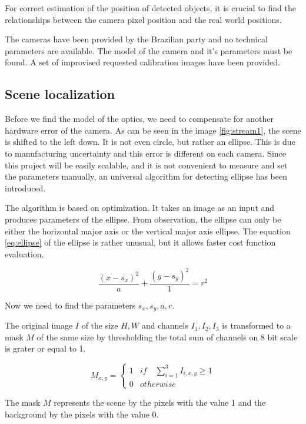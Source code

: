\documentclass[a4paper,12pt,titlepage, twoside]{article}
\numberwithin{figure}{section}
\begin{document}
For correct estimation of the position of detected objects, it is crucial to find the relationships between the camera pixel position and the real world positions. 

The cameras have been provided by the Brazilian party and no technical parameters are available. The model of the camera and it's parameters must be found. A set of improvised requested calibration images have been provided.

\subsection{Scene localization}
\label{sec:scene_localization}
Before we find the model of the optics, we need to compensate for another hardware error of the camera. As can be seen in the image \ref{fig:stream1}, the scene is shifted to the left down. It is not even circle, but rather an ellipse. This is due to manufacturing uncertainty and this error is different on each camera. Since this project will be easily scalable, and it is not convenient to measure and set the parameters manually, an universal algorithm for detecting ellipse has been introduced.

The algorithm is based on optimization. It takes an image as an input and produces parameters of the ellipse. From observation, the ellipse can only be either the horizontal major axis or the vertical major axis ellipse. The equation \ref{eq:ellipse} of the ellipse is rather unusual, but it allows faster cost function evaluation.

\begin{equation}
\label{eq:ellipse}
\frac{(x-s_x)^2}{a} + \frac{(y-s_y)^2}{1} = r^2
\end{equation}

Now we need to find the parameters $s_x, s_y, a, r$.

The original image $I$ of the size $H, W$ and channels $I_1, I_2, I_3$ is transformed to a mask $M$ of the same size by thresholding the total sum of channels on 8 bit scale is grater or equal to 1. \cite{lukacs1997real}

\begin{equation*}
M_{x,y} = \begin{cases}
1 & if \quad \sum_{i=1}^{3} I_{i,x,y} \geq 1 \\
0 & otherwise
\end{cases}
\end{equation*}

The mask $M$ represents the scene by the pixels with the value 1 and the background by the pixels with the value 0. 
\end{document}
